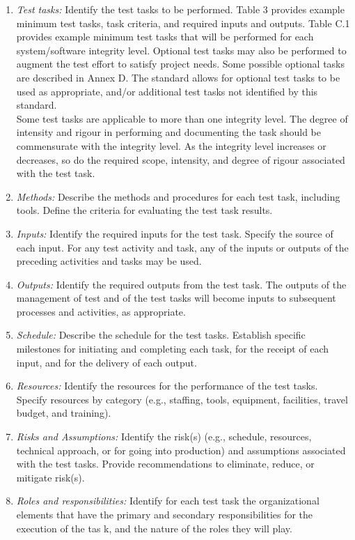 			\begin{enumerate}
			\item \emph{Test tasks:} Identify the test tasks to be performed. Table 3 provides example minimum test
			tasks, task criteria, and required inputs and outputs. Table C.1 provides example minimum
			test tasks that will be performed for each system/software integrity level.
			Optional test tasks may also be performed to augment the test effort to satisfy project needs.
			Some possible optional tasks are described in Annex D. The standard allows for optional
			test tasks to be used as appropriate, and/or additional test tasks not identified by this
			standard.\\
			Some test tasks are applicable to more than one integrity level. The degree of intensity and
			rigour in performing and documenting the task should be commensurate with the integrity
			level. As the integrity level increases or decreases, so do the required scope, intensity, and
			degree of rigour associated with the test task.
			\item \emph{Methods:} Describe the methods and procedures for each test task, including tools. Define
			the criteria for evaluating the test task results.
			\item \emph{Inputs:} Identify the required inputs for the test task. Specify the source of each input. For
			any test activity and task, any of the inputs or outputs of the preceding activities and tasks
			may be used.
			\item \emph{Outputs:} Identify the required outputs from the test task. The outputs of the management of
			test and of the test tasks will become inputs to subsequent processes and activities, as
			appropriate.
			\item \emph{Schedule:} Describe the schedule for the test tasks. Establish specific milestones for
			initiating and completing each task, for the receipt of each input, and for the delivery of
			each output.
			\item \emph{Resources:} Identify the resources for the performance of the test tasks. Specify resources by
			category (e.g., staffing, tools, equipment, facilities, travel budget, and training).
			\item \emph{Risks and Assumptions:} Identify the risk(s) (e.g., schedule, resources, technical approach, or
			for going into production) and assumptions associated with the test tasks. Provide
			recommendations to eliminate, reduce, or mitigate risk(s).
			\item \emph{Roles and responsibilities:} Identify for each test task the organizational elements that have
			the primary and secondary responsibilities for the execution of the tas
			k, and the nature of the roles they will play.
			\end{enumerate}
			
